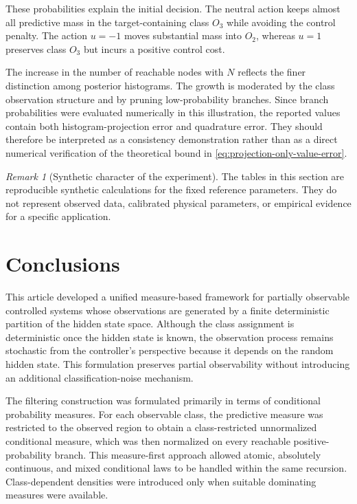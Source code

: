 \documentclass[10pt,twocolumn]{article}
\theoremstyle{remark}
\newtheorem{remark}{Remark}
\begin{document}
These probabilities explain the initial decision. The neutral action keeps almost all predictive mass in the target-containing class \(O_3\) while avoiding the control penalty. The action \(u=-1\) moves substantial mass into \(O_2\), whereas \(u=1\) preserves class \(O_3\) but incurs a positive control cost.

The increase in the number of reachable nodes with \(N\) reflects the finer distinction among posterior histograms. The growth is moderated by the class observation structure and by pruning low-probability branches. Since branch probabilities were evaluated numerically in this illustration, the reported values contain both histogram-projection error and quadrature error. They should therefore be interpreted as a consistency demonstration rather than as a direct numerical verification of the theoretical bound in
\cref{eq:projection-only-value-error}.

\begin{remark}[Synthetic character of the experiment]
	\label{rem:synthetic-reference-results}
	The tables in this section are reproducible synthetic calculations for the fixed reference parameters. They do not represent observed data, calibrated physical parameters, or empirical evidence for a specific application.
\end{remark}


%
%

\section{Conclusions}
\label{sec:conclusions}

This article developed a unified measure-based framework for partially observable controlled systems whose observations are generated by a finite deterministic partition of the hidden state space. Although the class assignment is deterministic once the hidden state is known, the observation process remains stochastic from the controller's perspective because it depends on the random hidden state. This formulation preserves partial observability without introducing an additional classification-noise mechanism.

The filtering construction was formulated primarily in terms of conditional probability measures. For each observable class, the predictive measure was restricted to the observed region to obtain a class-restricted unnormalized conditional measure, which was then normalized on every reachable positive-probability branch. This measure-first approach allowed atomic, absolutely continuous, and mixed conditional laws to be handled within the same recursion. Class-dependent densities were introduced only when suitable dominating measures were available.
\end{document}
